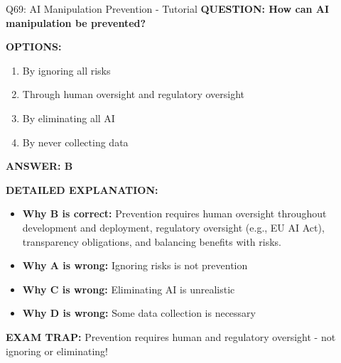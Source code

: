 \documentclass[8pt]{beamer}
\begin{document}
	\begin{frame}{Q69: AI Manipulation Prevention - Tutorial}
		\fontsize{6.5}{7.5}\selectfont
		\textbf{QUESTION: How can AI manipulation be prevented?}
		
		\vspace{0.1cm}
		\textbf{OPTIONS:}
		\begin{enumerate}
			\item By ignoring all risks
			\item Through human oversight and regulatory oversight
			\item By eliminating all AI
			\item By never collecting data
		\end{enumerate}
		
		\vspace{0.1cm}
		\textcolor{myblue}{\textbf{ANSWER: B}}
		
		\vspace{0.1cm}
		\textbf{DETAILED EXPLANATION:}
		\begin{itemize}
			\item \textbf{Why B is correct:} Prevention requires human oversight throughout development and deployment, regulatory oversight (e.g., EU AI Act), transparency obligations, and balancing benefits with risks.
			\item \textbf{Why A is wrong:} Ignoring risks is not prevention
			\item \textbf{Why C is wrong:} Eliminating AI is unrealistic
			\item \textbf{Why D is wrong:} Some data collection is necessary
		\end{itemize}
		
		\textcolor{myred}{\textbf{EXAM TRAP:}} Prevention requires \textcolor{myblue}{human and regulatory oversight} - not ignoring or eliminating!
	\end{frame}
	
\end{document}
